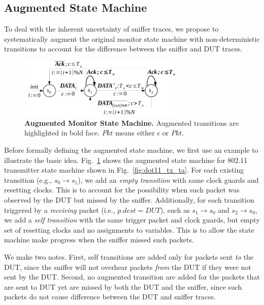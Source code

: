 \subsection{Augmented State Machine}
\label{subsec:augment}

To deal with the inherent uncertainty of sniffer traces, we propose to
systematically augment the original monitor state machine with non-deterministic
transitions to account for the difference between the sniffer and DUT traces.

\begin{figure}[H]
  \centering
  \vspace*{-5mm}
  \includegraphics[width=0.7\textwidth]{./figures/dot11_tx_checker.pdf}
  \caption{\textbf{Augmented Monitor State Machine.} Augmented transitions are
  highlighted in bold face. $\overline{Pkt}$ means either $\epsilon$ or $Pkt$.}
  \label{fig:augment}
  \vspace*{-8mm}
\end{figure}

Before formally defining the augmented state machine, we first use an example to
illustrate the basic idea. Fig.~\ref{fig:augment} shows the augmented state
machine for 802.11 transmitter state machine shown in
Fig.~\ref{fig:dot11_tx_ta}.  For each existing transition (e.g., $s_0\rightarrow
s_1$), we add an \textit{empty transition} with same clock guards and resetting
clocks.  This is to account for the possibility when such packet was observed by
the DUT but missed by the sniffer.  Additionally, for each transition triggered
by a \textit{receiving} packet (i.e., $p.dest = DUT$), such as $s_1\rightarrow
s_0$ and $s_2\rightarrow s_0$, we add a \textit{self transition} with the same
trigger packet and clock guards, but empty set of resetting clocks and no
assignments to variables. This is to
allow the state machine make progress when the sniffer missed such packets.

We make two notes. First, self transitions are added only for
packets sent \textit{to} the DUT, since the sniffer will not overhear packets
\textit{from} the DUT if they were not sent by the DUT. Second, no augmented
transition are added for the packets that are sent to DUT yet are missed by both
the DUT and the sniffer, since such packets do not cause difference between the
DUT and sniffer traces.

